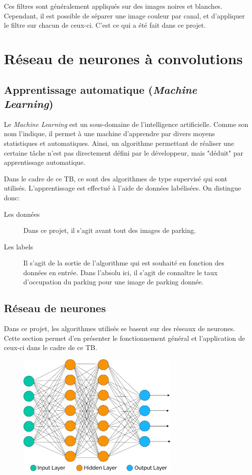 Ces filtres sont généralement appliqués sur des images noires et blanches. Cependant, il est possible de séparer une image couleur par canal, et d'appliquer le filtre sur chacun de ceux-ci. C'est ce qui a été fait dans ce projet.


\section{Réseau de neurones à convolutions}
\subsection{Apprentissage automatique (\textit{Machine Learning})}
Le \textit{Machine Learning} est un sous-domaine de l'intelligence artificielle. Comme son nom l'indique, il permet à une machine d'apprendre par divers moyens statistiques et automatiques.\autocite{wiki:ML} Ainsi, un algorithme permettant de réaliser une certaine tâche n'est pas directement défini par le développeur, mais "déduit" par apprentissage automatique.

Dans le cadre de ce TB, ce sont des algorithmes de type supervisé qui sont utilisés. L'apprentissage est effectué à l'aide de données labélisées. On distingue donc:
\begin{description}
    \item[Les données] Dans ce projet, il s'agit avant tout des images de parking. 
    \item[Les labels] Il s'agit de la sortie de l'algorithme qui est souhaité en fonction des données en entrée. Dans l'absolu ici, il s'agit de connaître le taux d'occupation du parking pour une image de parking donnée.
\end{description}

\subsection{Réseau de neurones}
Dans ce projet, les algorithmes utilisés se basent sur des réseaux de neurones. Cette section permet d'en présenter le fonctionnement général et l'application de ceux-ci dans le cadre de ce TB.
\begin{figure}[ht]
    \includegraphics[width=80mm]{img/bases_technologiques/NN.jpg}
    \centering
    \label{fig:nn}
\end{figure}

